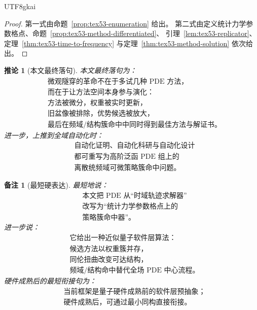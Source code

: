 \documentclass[12pt]{article}
\newtheorem{corollary}{推论}[section]
\newtheorem{remark}{备注}[section]
\begin{document}
\begin{CJK*}{UTF8}{gkai}
\begin{proof}
第一式由命题~\ref{prop:tex53-enumeration} 给出。
第二式由定义统计力学参数格点、命题~\ref{prop:tex53-method-differentiated}、
引理~\ref{lem:tex53-replicator}、定理~\ref{thm:tex53-time-to-frequency}
与定理~\ref{thm:tex53-method-solution} 依次给出。
\end{proof}

\begin{corollary}[本文最终落句]
本文最终落句为：
\[
  \boxed{
    \begin{aligned}
      &\text{微观隧穿的革命不在于多试几种 PDE 方法，}\\
      &\text{而在于让方法空间本身参与演化：}\\
      &\text{方法被微分，权重被实时更新，}\\
      &\text{旧盆像被排除，优势候选被放大，}\\
      &\text{最后在频域/结构簇命中中同时得到最佳方法与解证书。}
    \end{aligned}
  }
\]
进一步，上推到全域自动化时：
\[
  \boxed{
    \begin{aligned}
      &\text{自动化证明、自动化科研与自动化设计}\\
      &\text{都可重写为高阶泛函 PDE 组上的}\\
      &\text{离散统频域可微策略簇命中问题。}
    \end{aligned}
  }
\]
\end{corollary}

\begin{remark}[最短硬表达]
最短地说：
\[
  \boxed{
    \begin{aligned}
      &\text{本文把 PDE 从“时域轨迹求解器”}\\
      &\text{改写为“统计力学参数格点上的}\\
      &\text{策略簇命中器”。}
    \end{aligned}
  }
\]
进一步说：
\[
  \boxed{
    \begin{aligned}
      &\text{它给出一种近似量子软件层算法：}\\
      &\text{候选方法以权重簇并存，}\\
      &\text{同伦扭曲改变可达结构，}\\
      &\text{频域/结构命中替代全场 PDE 中心流程。}
    \end{aligned}
  }
\]
硬件成熟后的最短衔接句为：
\[
  \boxed{
    \begin{aligned}
      &\text{当前框架是量子硬件成熟前的软件层预抽象；}\\
      &\text{硬件成熟后，可通过最小同构直接衔接。}
    \end{aligned}
  }
\]
\end{remark}


\end{CJK*}
\end{document}
